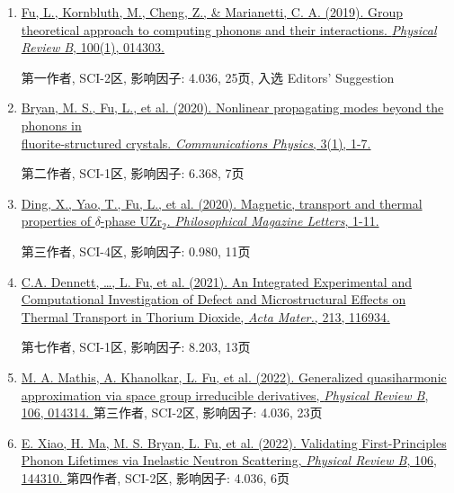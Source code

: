 \documentclass[
  a4paper,
  12pt
]{cv}
\begin{document}
\begin{enumerate}
\item
\href{https://doi.org/10.1103/PhysRevB.100.014303}
{\underline{Fu, L.}, Kornbluth, M., Cheng, Z., \& Marianetti, C. A. (2019). 
Group theoretical approach to computing phonons and their interactions. 
\textit{Physical Review B}, 100(1), 014303.}

第一作者, SCI-2区, 影响因子: 4.036, 25页, 入选 Editors' Suggestion
%
\item
\href{https://doi.org/10.1038/s42005-020-00483-2}{
Bryan, M. S., \underline{Fu, L.}, et al. (2020). 
Nonlinear propagating modes beyond the phonons in \\fluorite-structured crystals.
\textit{Communications Physics}, 3(1), 1-7.}

第二作者, SCI-1区, 影响因子: 6.368, 7页
%
\item
\href{https://doi.org/10.1080/09500839.2020.1833375}{
Ding, X., Yao, T., \underline{Fu, L.}, et al. (2020).
Magnetic, transport and thermal properties of $\delta$-phase UZr$_{2}$.
\textit{Philosophical Magazine Letters}, 1-11.}

第三作者, SCI-4区, 影响因子: 0.980, 11页
%
\item
\href{https://doi.org/10.1016/j.actamat.2021.116934}{
C.A. Dennett, \dots, \underline{L. Fu}, et al. (2021).
An Integrated Experimental and Computational Investigation of Defect and Microstructural Effects on Thermal Transport in Thorium Dioxide, %
\textit{Acta Mater.}, 213, 116934.
}

第七作者, SCI-1区, 影响因子: 8.203, 13页
%
\item
\href{https://doi.org/10.1103/PhysRevB.106.014314}{
M. A. Mathis, A. Khanolkar, \underline{L. Fu}, et al. (2022).
Generalized quasiharmonic approximation via space group irreducible derivatives,
\textit{Physical Review B}, 106, 014314.
}
第三作者, SCI-2区, 影响因子: 4.036, 23页

\item
\href{https://doi.org/10.1103/PhysRevB.106.144310}{
E. Xiao, H. Ma, M. S. Bryan, \underline{L. Fu}, et al. (2022).
Validating First-Principles Phonon Lifetimes via Inelastic Neutron Scattering,
\textit{Physical Review B}, 106, 144310.
}
第四作者, SCI-2区, 影响因子: 4.036, 6页

%
\end{enumerate}
\end{document}

